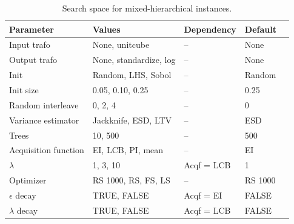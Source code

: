 \begin{table}[H]
  \centering
  \caption{Search space for mixed-hierarchical instances.}
  \label{tab:mlr3mbo-search-space-mixed}
  \begin{tabular}{lllll}
    \toprule
    Parameter            & Values                 & Dependency & Default \\
    \midrule
    Input trafo          & None, unitcube         & --         & None    \\
    Output trafo         & None, standardize, log & --         & None    \\
    Init                 & Random, LHS, Sobol     & --         & Random  \\
    Init size            & 0.05, 0.10, 0.25       & --         & 0.25    \\
    Random interleave    & 0, 2, 4                & --         & 0       \\
    Variance estimator   & Jackknife, ESD, LTV    & --         & ESD     \\
    Trees                & 10, 500                & --         & 500     \\
    Acquisition function & EI, LCB, PI, mean      & --         & EI      \\
    $\lambda$            & 1, 3, 10               & Acqf = LCB & 1      \\
    Optimizer            & RS 1000, RS, FS, LS    & --         & RS 1000 \\
    $\epsilon$ decay     & TRUE, FALSE            & Acqf = EI  & FALSE   \\
    $\lambda$ decay      & TRUE, FALSE            & Acqf = LCB & FALSE      \\
    \bottomrule
  \end{tabular}
\end{table}